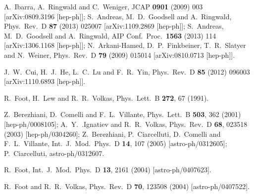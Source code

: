 \documentclass[12pt]{article}
\begin{document}
{{\begin{thebibliography}{999}
  A.~Ibarra, A.~Ringwald and C.~Weniger,
  JCAP {\bf 0901} (2009) 003
  [arXiv:0809.3196 [hep-ph]];
  S.~Andreas, M.~D.~Goodsell and A.~Ringwald,
  Phys.\ Rev.\ D {\bf 87} (2013) 025007
  [arXiv:1109.2869 [hep-ph]];
  S.~Andreas, M.~D.~Goodsell and A.~Ringwald,
  AIP Conf.\ Proc.\  {\bf 1563} (2013) 114
  [arXiv:1306.1168 [hep-ph]];
  N.~Arkani-Hamed, D.~P.~Finkbeiner, T.~R.~Slatyer and N.~Weiner,
  Phys.\ Rev.\ D {\bf 79} (2009) 015014
  [arXiv:0810.0713 [hep-ph]].
  
  J.~W.~Cui, H.~J.~He, L.~C.~Lu and F.~R.~Yin,
  Phys.\ Rev.\ D {\bf 85} (2012) 096003
  [arXiv:1110.6893 [hep-ph]].
  
  R.~Foot, H.~Lew and R.~R.~Volkas,
  Phys.\ Lett.\ B {\bf 272}, 67 (1991).
  
  Z.~Berezhiani, D.~Comelli and F.~L.~Villante,
  Phys.\ Lett.\ B {\bf 503}, 362 (2001)
  [hep-ph/0008105];
  A.~Y.~.Ignatiev and R.~R.~Volkas,
  Phys.\ Rev.\ D {\bf 68}, 023518 (2003)
  [hep-ph/0304260];
  Z.~Berezhiani, P.~Ciarcelluti, D.~Comelli and F.~L.~Villante,
  Int.\ J.\ Mod.\ Phys.\ D {\bf 14}, 107 (2005)
  [astro-ph/0312605];
  P.~Ciarcelluti,
  astro-ph/0312607.
  
  R.~Foot,
  Int.\ J.\ Mod.\ Phys.\ D {\bf 13}, 2161 (2004)
  [astro-ph/0407623].
  
  R.~Foot and R.~R.~Volkas,
  Phys.\ Rev.\ D {\bf 70}, 123508 (2004)
  [astro-ph/0407522].


\end{thebibliography}}}
\end{document}
